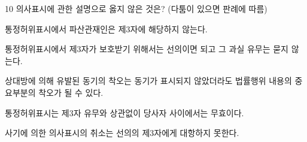 \begin{question}{10}
의사표시에 관한 설명으로 옳지 않은 것은? (다툼이 있으면 판례에 따름)
\begin{choices}
  \item 통정허위표시에서 파산관재인은 제3자에 해당하지 않는다.
  \item 통정허위표시에서 제3자가 보호받기 위해서는 선의이면 되고 그 과실 유무는 묻지 않는다.
  \item 상대방에 의해 유발된 동기의 착오는 동기가 표시되지 않았더라도 법률행위 내용의 중요부분의 착오가 될 수 있다.
  \item 통정허위표시는 제3자 유무와 상관없이 당사자 사이에서는 무효이다.
  \item 사기에 의한 의사표시의 취소는 선의의 제3자에게 대항하지 못한다.
\end{choices}
\end{question}

